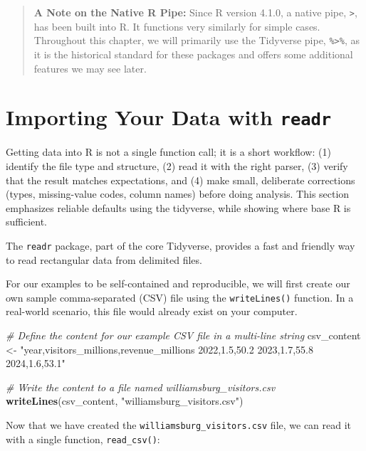 \documentclass[
  11pt,
]{article}
\newenvironment{Shaded}{\begin{snugshade}}{\end{snugshade}}
\newcommand{\CommentTok}[1]{\textcolor[rgb]{0.56,0.35,0.01}{\textit{#1}}}
\newcommand{\FunctionTok}[1]{\textcolor[rgb]{0.13,0.29,0.53}{\textbf{#1}}}
\newcommand{\NormalTok}[1]{#1}
\newcommand{\OtherTok}[1]{\textcolor[rgb]{0.56,0.35,0.01}{#1}}
\newcommand{\StringTok}[1]{\textcolor[rgb]{0.31,0.60,0.02}{#1}}
\begin{document}
\begin{quote}
\textbf{A Note on the Native R Pipe:} Since R version 4.1.0, a native
pipe, \texttt{\textbar{}\textgreater{}}, has been built into R. It
functions very similarly for simple cases. Throughout this chapter, we
will primarily use the Tidyverse pipe, \texttt{\%\textgreater{}\%}, as
it is the historical standard for these packages and offers some
additional features we may see later.
\end{quote}

\section{\texorpdfstring{Importing Your Data with
\texttt{readr}}{Importing Your Data with readr}}\label{importing-your-data-with-readr}

Getting data into R is not a single function call; it is a short
workflow: (1) identify the file type and structure, (2) read it with the
right parser, (3) verify that the result matches expectations, and (4)
make small, deliberate corrections (types, missing-value codes, column
names) before doing analysis. This section emphasizes reliable defaults
using the tidyverse, while showing where base R is sufficient.

The \texttt{readr} package, part of the core Tidyverse, provides a fast
and friendly way to read rectangular data from delimited files.

For our examples to be self-contained and reproducible, we will first
create our own sample comma-separated (CSV) file using the
\texttt{writeLines()} function. In a real-world scenario, this file
would already exist on your computer.

\begin{Shaded}
\begin{Highlighting}[]
\CommentTok{\# Define the content for our example CSV file in a multi{-}line string}
\NormalTok{csv\_content }\OtherTok{\textless{}{-}} \StringTok{"year,visitors\_millions,revenue\_millions}
\StringTok{2022,1.5,50.2}
\StringTok{2023,1.7,55.8}
\StringTok{2024,1.6,53.1"}

\CommentTok{\# Write the content to a file named \textquotesingle{}williamsburg\_visitors.csv\textquotesingle{}}
\FunctionTok{writeLines}\NormalTok{(csv\_content, }\StringTok{"williamsburg\_visitors.csv"}\NormalTok{)}
\end{Highlighting}
\end{Shaded}

Now that we have created the \texttt{williamsburg\_visitors.csv} file,
we can read it with a single function, \texttt{read\_csv()}:
\end{document}
